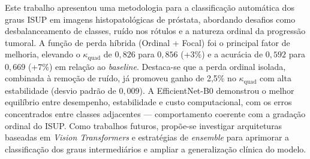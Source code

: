 Este trabalho apresentou uma metodologia para a classificação automática dos graus ISUP em imagens histopatológicas de próstata, abordando desafios como desbalanceamento de classes, ruído nos rótulos e a natureza ordinal da progressão tumoral. A função de perda híbrida (Ordinal + Focal) foi o principal fator de melhoria, elevando o $\kappa_{\text{quad}}$ de $0{,}826$ para $0{,}856$ (+3\%) e a acurácia de $0{,}592$ para $0{,}669$ (+7\%) em relação ao \textit{baseline}. Destaca-se que a perda ordinal isolada, combinada à remoção de ruído, já promoveu ganho de 2,5\% no $\kappa_{\text{quad}}$ com alta estabilidade (desvio padrão de $0{,}009$). A EfficientNet-B0 demonstrou o melhor equilíbrio entre desempenho, estabilidade e custo computacional, com os erros concentrados entre classes adjacentes — comportamento coerente com a gradação ordinal do ISUP. Como trabalhos futuros, propõe-se investigar arquiteturas baseadas em \textit{Vision Transformers} e estratégias de \textit{ensemble} para aprimorar a classificação dos graus intermediários e ampliar a generalização clínica do modelo.
